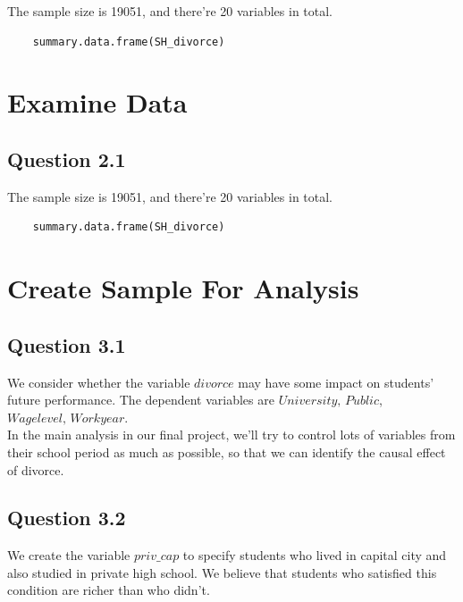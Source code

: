 \documentclass[11pt, letterpaper]{article}
\begin{document}
The sample size is 19051, and there're 20 variables in total.

\begin{lstlisting}
    summary.data.frame(SH_divorce)
\end{lstlisting}




\section{Examine Data}


\subsection*{Question 2.1}

The sample size is 19051, and there're 20 variables in total.

\begin{lstlisting}
    summary.data.frame(SH_divorce)
\end{lstlisting}



\section{Create Sample For Analysis}


\subsection*{Question 3.1}

We consider whether the variable $\textit{divorce}$ may have some impact on students' future performance.
The dependent variables are $\textit{University, Public}$, \\
$\textit{Wagelevel, Workyear}$. \\

In the main analysis in our final project, we'll try to control lots of variables from their school period as much as possible, so that we can identify the causal effect of divorce.


\subsection*{Question 3.2}

We create the variable $\textit{priv}\_\textit{cap}$ to specify students who lived in capital city and also studied in private high school.
We believe that students who satisfied this condition are richer than who didn't.
\end{document}
